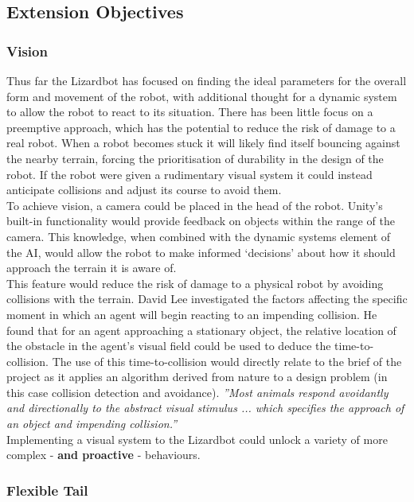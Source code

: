 \documentclass{article}
\begin{document}
\subsection{Extension Objectives}
\subsubsection{Vision}
Thus far the Lizardbot has focused on finding the ideal parameters for the overall form and movement of the robot, with additional thought for a dynamic system to allow the robot to react to its situation. There has been little focus on a preemptive approach, which has the potential to reduce the risk of damage to a real robot. When a robot becomes stuck it will likely find itself bouncing against the nearby terrain, forcing the prioritisation of durability in the design of the robot. If the robot were given a rudimentary visual system it could instead anticipate collisions and adjust its course to avoid them.\\
To achieve vision, a camera could be placed in the head of the robot. Unity’s built-in functionality would provide feedback on objects within the range of the camera. This knowledge, when combined with the dynamic systems element of the AI, would allow the robot to make informed ‘decisions’ about how it should approach the terrain it is aware of. \\
This feature would reduce the risk of damage to a physical robot by avoiding collisions with the terrain. David Lee investigated the factors affecting the specific moment in which an agent will begin reacting to an impending collision. He found that for an agent approaching a stationary object, the relative location of the obstacle in the agent’s visual field could be used to deduce the time-to-collision.  The use of this time-to-collision would directly relate to the brief of the project as it applies an algorithm derived from nature to a design problem (in this case collision detection and avoidance). \textit{”Most animals respond avoidantly and directionally to the abstract visual stimulus ... which specifies the approach of an object and impending collision.”} \\
Implementing a visual system to the Lizardbot could unlock a variety of more complex - \textbf{and proactive} - behaviours.
\subsubsection{Flexible Tail}
\end{document}
